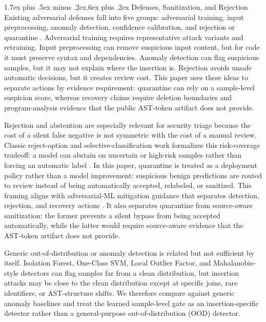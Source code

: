 \documentclass[letterpaper,twocolumn,10pt,twoside]{article}
\makeatletter
\renewcommand\subsection{\@startsection{subsection}{2}{\z@}%
  {1.7ex plus .5ex minus .2ex}{.6ex plus .2ex}%
  {\normalfont\normalsize\bfseries}}
\newcommand{\gate}{sample-level gate}
\makeatother
\begin{document}
\subsection{Defenses, Sanitization, and Rejection}
Existing adversarial defenses fall into five groups: adversarial training, input preprocessing, anomaly detection, confidence calibration, and rejection or quarantine \cite{biggio2018wild,nist2024aml}. Adversarial training requires representative attack variants and retraining. Input preprocessing can remove suspicious input content, but for code it must preserve syntax and dependencies. Anomaly detection can flag suspicious samples, but it may not explain where the insertion is. Rejection avoids unsafe automatic decisions, but it creates review cost. This paper uses these ideas to separate actions by evidence requirement: quarantine can rely on a sample-level suspicion score, whereas recovery claims require deletion boundaries and program-analysis evidence that the public AST-token artifact does not provide.

Rejection and abstention are especially relevant for security triage because the cost of a silent false negative is not symmetric with the cost of a manual review. Classic reject-option and selective-classification work formalizes this risk-coverage tradeoff: a model can abstain on uncertain or high-risk samples rather than forcing an automatic label \cite{chow1970reject,geifman2017selective,geifman2019selectivenet,liu2019deepgamblers}. In this paper, quarantine is treated as a deployment policy rather than a model improvement: suspicious benign predictions are routed to review instead of being automatically accepted, relabeled, or sanitized. This framing aligns with adversarial-ML mitigation guidance that separates detection, rejection, and recovery actions \cite{biggio2018wild,nist2024aml}. It also separates quarantine from source-aware sanitization: the former prevents a silent bypass from being accepted automatically, while the latter would require source-aware evidence that the AST-token artifact does not provide.

Generic out-of-distribution or anomaly detection is related but not sufficient by itself. Isolation Forest, One-Class SVM, Local Outlier Factor, and Mahalanobis-style detectors can flag samples far from a clean distribution, but insertion attacks may be close to the clean distribution except at specific joins, rare identifiers, or AST-structure shifts. We therefore compare against generic anomaly baselines and treat the learned \gate{} as an insertion-specific detector rather than a general-purpose out-of-distribution (OOD) detector.
\end{document}
